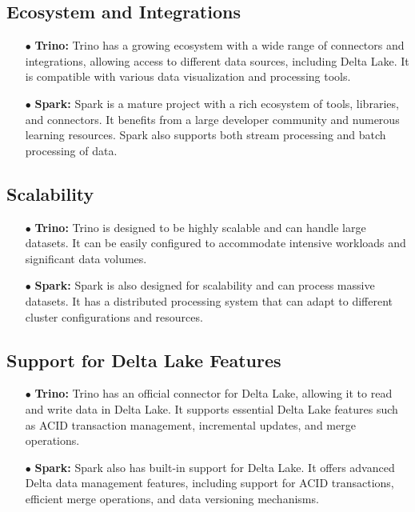 \subsection{Ecosystem and Integrations}
\begin{enumerate}
\item[$\bullet$] \textbf{Trino:} Trino has a growing ecosystem with a wide range of connectors and integrations, allowing access to different data sources, including Delta Lake. It is compatible with various data visualization and processing tools.
\item[$\bullet$] \textbf{Spark:} Spark is a mature project with a rich ecosystem of tools, libraries, and connectors. It benefits from a large developer community and numerous learning resources. Spark also supports both stream processing and batch processing of data.
\end{enumerate}

\subsection{Scalability}
\begin{enumerate}
\item[$\bullet$] \textbf{Trino:} Trino is designed to be highly scalable and can handle large datasets. It can be easily configured to accommodate intensive workloads and significant data volumes.
\item[$\bullet$] \textbf{Spark:} Spark is also designed for scalability and can process massive datasets. It has a distributed processing system that can adapt to different cluster configurations and resources.
\end{enumerate}

\subsection{Support for Delta Lake Features}
\begin{enumerate}
\item[$\bullet$] \textbf{Trino:} Trino has an official connector for Delta Lake, allowing it to read and write data in Delta Lake. It supports essential Delta Lake features such as ACID transaction management, incremental updates, and merge operations.
\item[$\bullet$] \textbf{Spark:} Spark also has built-in support for Delta Lake. It offers advanced Delta data management features, including support for ACID transactions, efficient merge operations, and data versioning mechanisms.
\end{enumerate}

